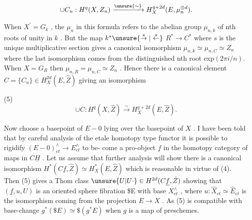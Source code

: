 
\margin{\handwritten{$\checkmark$}}\[ \cup C_n : H^q(X, Z_n) \xrightarrow{\unsure{\sim}} H^{q+2d}_X (E, \mu_n^{\otimes d}) . \]

When $X^\prime = G_k$ , the $\mu_n$ in this formula refers to the abelian
group $\mu_{n,k}$ of nth roots of unity in $k$ . But the map $k^* \unsure{\overset{s}{\rightarrow}|\overset{s}{\leftarrow}}$
$R^* \to C^*$ where $s$ is the unique multiplicative section gives a
canonical isomorphism $\mu_{n,k} \simeq \mu_{n,C} \simeq Z_n$ where the last isomorphism
comes from the distinguished nth root exp$(2\pi i/n)$. When $X = G_R$
then $\mu_{n,R} = \mu_{n,C} \simeq Z_n$ . Hence there is a canonical element
$C = \{C_n\} \in H^{2d}_X(E, \hat{Z})$ giving an isomorphism

(5) \[ \cup C : H^q(X, \hat{Z}) \xrightarrow{\sim} H^{q+2d}_X(E, \hat{Z}) . \]

Now choose a basepoint of $E - 0$ lying over the basepoint of $X$ .
I have been told that by careful analysis of the etale homotopy
type functor it is possible to rigidify $(E - 0)^\wedge_{et} \to E^\wedge_{et}$ to be-%
come a pro-object $\underline{f}$ in the homotopy category of maps in $C\underline{H}$ .
Let us assume that further analysis will show there is a canonical
isomorphism $H^*(C\underline{f}, \hat{Z}) \simeq H^*_X(E, \hat{Z})$ which is reasonable in virtue of
(4). Then (5) gives a Thom class $\unsure{U|U\cdot} \in H^{2d}(C\underline{f}, \hat{Z})$ showing that
$(\underline{f},u,U)$ is an oriented sphere fibration \$E with base $X^\wedge_{et}$ ,
where $u : \hat{X}_{et} \simeq \hat{E}_{et}$ is the isomorphism coming from the projection
$E \to X$ . As (5) is compatible with base-change $g^*(\$E) \simeq \$(g^*E)$
when $g$ is a map of preschemes.

